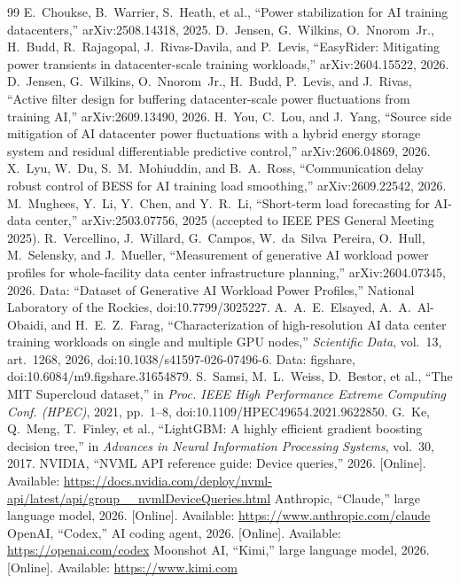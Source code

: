 \documentclass[conference]{IEEEtran}
\begin{document}
\begin{thebibliography}{99}
 E.~Choukse, B.~Warrier, S.~Heath, et al., ``Power stabilization for AI training datacenters,'' arXiv:2508.14318, 2025.
 D.~Jensen, G.~Wilkins, O.~Nnorom~Jr., H.~Budd, R.~Rajagopal, J.~Rivas-Davila, and P.~Levis, ``EasyRider: Mitigating power transients in datacenter-scale training workloads,'' arXiv:2604.15522, 2026.
 D.~Jensen, G.~Wilkins, O.~Nnorom~Jr., H.~Budd, P.~Levis, and J.~Rivas, ``Active filter design for buffering datacenter-scale power fluctuations from training AI,'' arXiv:2609.13490, 2026.
 H.~You, C.~Lou, and J.~Yang, ``Source side mitigation of AI datacenter power fluctuations with a hybrid energy storage system and residual differentiable predictive control,'' arXiv:2606.04869, 2026.
 X.~Lyu, W.~Du, S.~M.~Mohiuddin, and B.~A.~Ross, ``Communication delay robust control of BESS for AI training load smoothing,'' arXiv:2609.22542, 2026.
 M.~Mughees, Y.~Li, Y.~Chen, and Y.~R.~Li, ``Short-term load forecasting for AI-data center,'' arXiv:2503.07756, 2025 (accepted to IEEE PES General Meeting 2025).
 R.~Vercellino, J.~Willard, G.~Campos, W.~da~Silva~Pereira, O.~Hull, M.~Selensky, and J.~Mueller, ``Measurement of generative AI workload power profiles for whole-facility data center infrastructure planning,'' arXiv:2604.07345, 2026. Data: ``Dataset of Generative AI Workload Power Profiles,'' National Laboratory of the Rockies, doi:10.7799/3025227.
 A.~A.~E.~Elsayed, A.~A.~Al-Obaidi, and H.~E.~Z.~Farag, ``Characterization of high-resolution AI data center training workloads on single and multiple GPU nodes,'' \emph{Scientific Data}, vol.~13, art.~1268, 2026, doi:10.1038/s41597-026-07496-6. Data: figshare, doi:10.6084/m9.figshare.31654879.
 S.~Samsi, M.~L.~Weiss, D.~Bestor, et al., ``The MIT Supercloud dataset,'' in \emph{Proc. IEEE High Performance Extreme Computing Conf. (HPEC)}, 2021, pp.~1--8, doi:10.1109/HPEC49654.2021.9622850.
 G.~Ke, Q.~Meng, T.~Finley, et al., ``LightGBM: A highly efficient gradient boosting decision tree,'' in \emph{Advances in Neural Information Processing Systems}, vol.~30, 2017.
 NVIDIA, ``NVML API reference guide: Device queries,'' 2026. [Online]. Available: \url{https://docs.nvidia.com/deploy/nvml-api/latest/api/group__nvmlDeviceQueries.html}
 Anthropic, ``Claude,'' large language model, 2026. [Online]. Available: \url{https://www.anthropic.com/claude}
 OpenAI, ``Codex,'' AI coding agent, 2026. [Online]. Available: \url{https://openai.com/codex}
 Moonshot AI, ``Kimi,'' large language model, 2026. [Online]. Available: \url{https://www.kimi.com}
\end{thebibliography}
\end{document}
